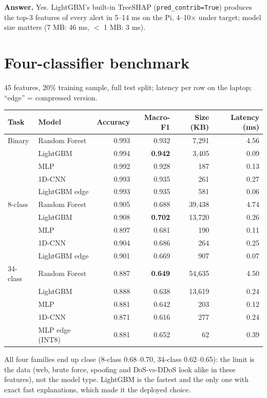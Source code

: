 \documentclass[11pt,a4paper]{article}
\newcommand{\answer}[1]{\par\noindent\colorbox{accent!8}{\parbox{\dimexpr\linewidth-2\fboxsep}{\vspace{0.4em}\textbf{Answer.} #1\vspace{0.4em}}}\par}
\begin{document}
\answer{Yes. LightGBM's built-in TreeSHAP (\texttt{pred\_contrib=True}) produces the top-3 features of every alert in
5--14 ms on the Pi, 4--10$\times$ under target; model size matters (7 MB: 46 ms, $<$ 1 MB: 3 ms).}

\section{Four-classifier benchmark}

45 features, 20\% training sample, full test split; latency per row on the laptop; ``edge'' = compressed version.

\begin{center}
\small
\begin{tabular}{llrrrr}
\toprule
Task & Model & Accuracy & Macro-F1 & Size (KB) & Latency (ms) \\
\midrule
Binary & Random Forest & 0.993 & 0.932 & 7,291 & 4.56 \\
& LightGBM & 0.994 & \textbf{0.942} & 3,405 & 0.09 \\
& MLP & 0.992 & 0.928 & 187 & 0.13 \\
& 1D-CNN & 0.993 & 0.935 & 261 & 0.27 \\
& LightGBM edge & 0.993 & 0.935 & 581 & 0.06 \\
\midrule
8-class & Random Forest & 0.905 & 0.688 & 39,438 & 4.74 \\
& LightGBM & 0.908 & \textbf{0.702} & 13,720 & 0.26 \\
& MLP & 0.897 & 0.681 & 190 & 0.11 \\
& 1D-CNN & 0.904 & 0.686 & 264 & 0.25 \\
& LightGBM edge & 0.901 & 0.669 & 907 & 0.07 \\
\midrule
34-class & Random Forest & 0.887 & \textbf{0.649} & 54,635 & 4.50 \\
& LightGBM & 0.888 & 0.638 & 13,619 & 0.24 \\
& MLP & 0.881 & 0.642 & 203 & 0.12 \\
& 1D-CNN & 0.871 & 0.616 & 277 & 0.24 \\
& MLP edge (INT8) & 0.881 & 0.652 & 62 & 0.39 \\
\bottomrule
\end{tabular}
\end{center}

All four families end up close (8-class 0.68--0.70, 34-class 0.62--0.65): the limit is the data (web, brute force,
spoofing and DoS-vs-DDoS look alike in these features), not the model type. LightGBM is the fastest and the only one
with exact fast explanations, which made it the deployed choice.
\end{document}

